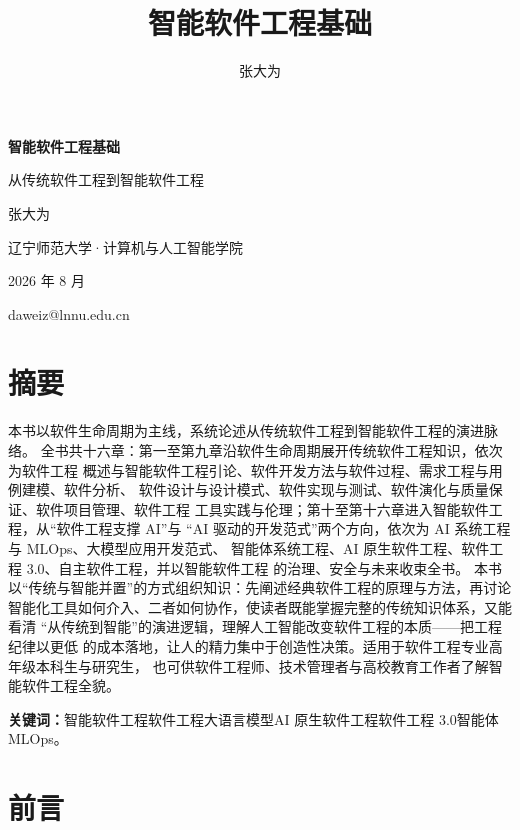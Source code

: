 \documentclass[12pt,a4paper,twoside,openany]{ctexbook}
\title{智能软件工程基础}
\author{张大为}
\numberwithin{figure}{chapter}
\numberwithin{table}{chapter}
\begin{document}
\begin{titlepage}
\centering
\vspace*{3cm}
{\Huge\bfseries 智能软件工程基础\par}
\vspace{0.8cm}
{\LARGE 从传统软件工程到智能软件工程\par}
\vspace{2.5cm}
{\Large 张大为\par}
\vspace{1cm}
{\large 辽宁师范大学·计算机与人工智能学院\par}
\vspace{1.5cm}
{\large 2026 年 8 月\par}
\vspace{1cm}
{\normalsize daweiz@lnnu.edu.cn\par}
\vfill
\end{titlepage}

\chapter*{摘要}
本书以软件生命周期为主线，系统论述从传统软件工程到智能软件工程的演进脉络。
全书共十六章：第一至第九章沿软件生命周期展开传统软件工程知识，依次为软件工程
概述与智能软件工程引论、软件开发方法与软件过程、需求工程与用例建模、软件分析、
软件设计与设计模式、软件实现与测试、软件演化与质量保证、软件项目管理、软件工程
工具实践与伦理；第十至第十六章进入智能软件工程，从``软件工程支撑 AI''与
``AI 驱动的开发范式''两个方向，依次为 AI 系统工程与
MLOps、大模型应用开发范式、 智能体系统工程、AI 原生软件工程、软件工程
3.0、自主软件工程，并以智能软件工程 的治理、安全与未来收束全书。
本书以``传统与智能并置''的方式组织知识：先阐述经典软件工程的原理与方法，再讨论
智能化工具如何介入、二者如何协作，使读者既能掌握完整的传统知识体系，又能看清
``从传统到智能''的演进逻辑，理解人工智能改变软件工程的本质------把工程纪律以更低
的成本落地，让人的精力集中于创造性决策。适用于软件工程专业高年级本科生与研究生，
也可供软件工程师、技术管理者与高校教育工作者了解智能软件工程全貌。
\par\vspace{1em}
\noindent\textbf{关键词：}智能软件工程软件工程大语言模型AI
原生软件工程软件工程 3.0智能体MLOps。
\clearpage

\tableofcontents

\chapter*{前言}\label{ux524dux8a00}
\end{document}
